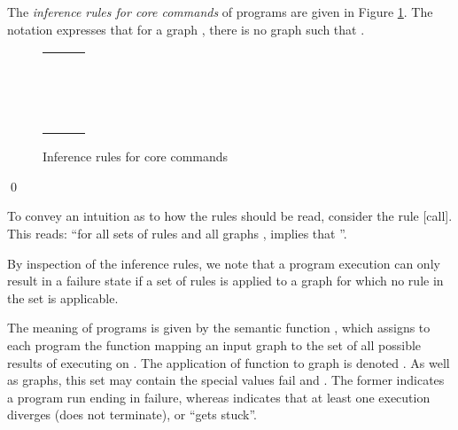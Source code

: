 \documentclass{llncs}
\begin{document}
	\begin{definition}\label{def:core_sos_rules}\rm
		The \emph{inference rules for core commands} of programs are given in Figure \ref{fig:core_sos_rules}. The notation  expresses that for a graph , there is no graph  such that .

	\begin{figure}[htb]
	\centering
	\begin{tabular}{lcl}
	  
	&&
	 
	\\\\
	  
	&&
	 
	\\\\
	 
	\\\\
	\multicolumn{3}{c}{ }
	\\\\
	\multicolumn{3}{c}{ }
	\\\\
	\multicolumn{3}{c}{ }
	\\\\
	\multicolumn{3}{c}{ }
	\\\\
	 
	&&
	 
	\end{tabular} 
	\caption{Inference rules for core commands}\label{fig:core_sos_rules}
	\end{figure}
		\qed
	\end{definition}

	To convey an intuition as to how the rules should be read, consider the rule [call]. This reads: ``for all sets of rules  and all graphs ,  implies that ''.


	By inspection of the inference rules, we note that a program execution can only result in a failure state if a set of rules is applied to a graph for which no rule in the set is applicable.

	The meaning of programs is given by the semantic function , which assigns to each program  the function  mapping an input graph  to the set of all possible results of executing  on . The application of function  to graph  is denoted . As well as graphs, this set may contain the special values fail and . The former indicates a program run ending in failure, whereas  indicates that at least one execution diverges (does not terminate), or ``gets stuck''.
\end{document}
